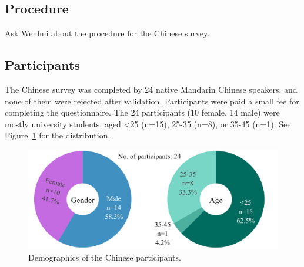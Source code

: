 \documentclass[11pt]{article}
\begin{document}

\subsection{Procedure}

Ask Wenhui about the procedure for the Chinese survey.

\subsection{Participants}

The Chinese survey was completed by 24 native Mandarin Chinese speakers, and none of them were rejected after validation. Participants were paid a small fee for completing the questionnaire. The 24 participants (10 female, 14 male) were mostly university students, aged <25 (n=15), 25-35 (n=8), or 35-45 (n=1). See Figure~\ref{fig:demographics_zh} for the distribution.

\begin{figure}[ht]
  \centering
  \includegraphics[width=\linewidth]{../demographics_zh}
  \caption{Demographics of the Chinese participants.}
  \label{fig:demographics_zh}
\end{figure}







\end{document}
